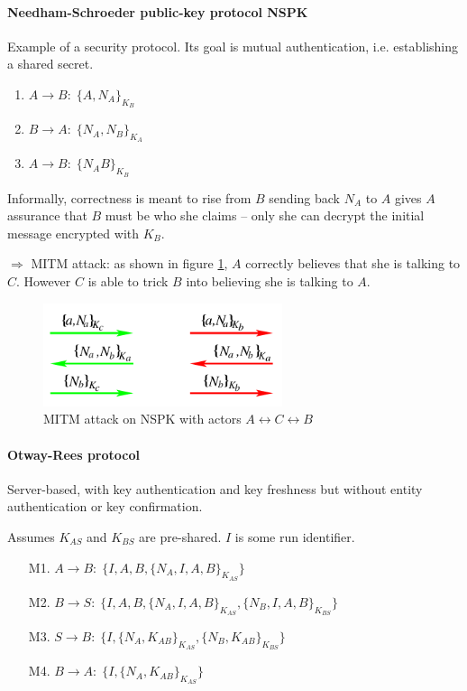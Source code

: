 \paragraph{Needham-Schroeder public-key protocol NSPK}
Example of a security protocol. Its goal is mutual authentication, i.e. establishing a shared secret.

\begin{enumerate}[leftmargin=6cm]
    \item $ A \rightarrow B :\; \{A, N_A \}_{K_B} $
    \item $ B \rightarrow A :\; \{N_A, N_B \}_{K_A} $
    \item $ A \rightarrow B :\; \{N_AB \}_{K_B} $
\end{enumerate}

Informally, correctness is meant to rise from $B$ sending back $N_A$ to $A$ gives $A$ assurance that $B$ must be who she claims -- only she can decrypt the initial message encrypted with $K_B$.

$\Rightarrow$ MITM attack: as shown in figure \ref{fig:nspk-attack}, $A$ correctly believes that she is talking to $C$. However $C$ is able to trick $B$ into believing she is talking to $A$.

\begin{figure}[h]
    \centering
    \includegraphics[width=7cm]{images/ch7-nspk-attack.png}
    \caption{MITM attack on NSPK with actors $A \leftrightarrow C \leftrightarrow B$}
    \label{fig:nspk-attack}
\end{figure}

\paragraph{Otway-Rees protocol}
Server-based, with key authentication and key freshness but without entity authentication or key confirmation.

Assumes $K_{AS}$ and $K_{BS}$ are pre-shared. $I$ is some run identifier.

\begin{enumerate}[leftmargin=4cm]
    \item[M1.] $A \rightarrow B:\; \{ I,A,B,\{N_A,I,A,B\}_{K_{AS}} \} $
    \item[M2.] $B \rightarrow S:\; \{ I,A,B,\{N_A,I,A,B\}_{K_{AS}}, \{N_B,I,A,B\}_{K_{BS}} \} $
    \item[M3.] $S \rightarrow B:\; \{ I,\{N_A,K_{AB}\}_{K_{AS}}, \{N_B,K_{AB}\}_{K_{BS}} \} $
    \item[M4.] $B \rightarrow A:\; \{ I,\{N_A,K_{AB}\}_{K_{AS}} \} $
\end{enumerate}

